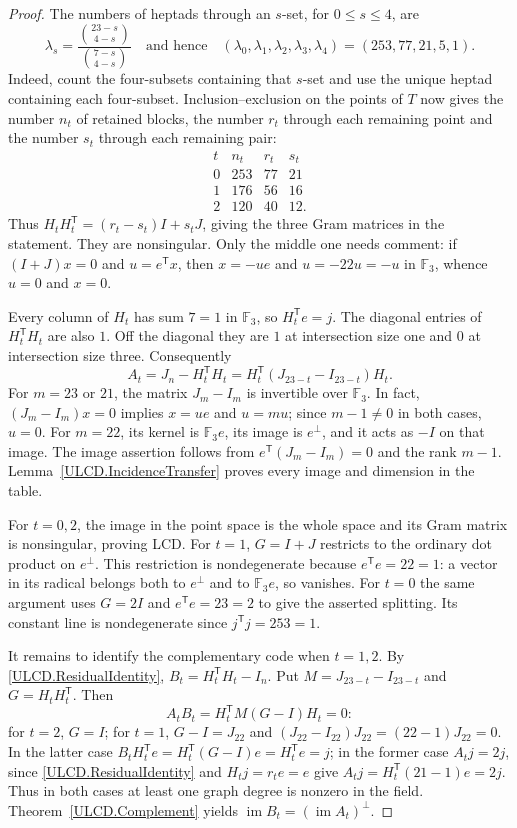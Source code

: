 \documentclass[11pt,a4paper]{article}
\numberwithin{equation}{section}
\newcommand{\im}{\operatorname{im}}
\begin{document}
\begin{proof}
The numbers of heptads through an $s$-set, for $0\leq s\leq4$, are
\[
 \lambda_s=\frac{\binom{23-s}{4-s}}{\binom{7-s}{4-s}}
       \quad\text{and hence}\quad
 (\lambda_0,\lambda_1,\lambda_2,\lambda_3,\lambda_4)
       =(253,77,21,5,1).
\]
Indeed, count the four-subsets containing that $s$-set and use the unique
heptad containing each four-subset. Inclusion--exclusion on the points of
$T$ now gives the number $n_t$ of retained blocks, the number $r_t$ through
each remaining point and the number $s_t$ through each remaining pair:
\[
\begin{array}{c|rrr}
t&n_t&r_t&s_t\\\hline
0&253&77&21\\
1&176&56&16\\
2&120&40&12.
\end{array}
\]
Thus $H_tH_t^{\mathsf T}=(r_t-s_t)I+s_tJ$, giving the three Gram matrices
in the statement. They are nonsingular. Only the middle one needs comment:
if $(I+J)x=0$ and $u=e^{\mathsf T}x$, then $x=-ue$ and
$u=-22u=-u$ in $\mathbb F_3$, whence $u=0$ and $x=0$.

Every column of $H_t$ has sum $7=1$ in $\mathbb F_3$, so
$H_t^{\mathsf T}e=j$. The diagonal entries of $H_t^{\mathsf T}H_t$ are
also $1$. Off the diagonal they are $1$ at intersection size one and $0$
at intersection size three. Consequently
\[
 A_t=J_n-H_t^{\mathsf T}H_t
     =H_t^{\mathsf T}(J_{23-t}-I_{23-t})H_t.                 \tag{2.1}\label{ULCD.ResidualIdentity}
\]
For $m=23$ or $21$, the matrix $J_m-I_m$ is invertible over $\mathbb F_3$.
In fact, $(J_m-I_m)x=0$ implies $x=ue$ and $u=mu$; since $m-1\ne0$
in both cases, $u=0$. For $m=22$, its kernel is $\mathbb F_3e$, its image
is $e^\perp$, and it acts as $-I$ on that image. The image assertion follows
from $e^{\mathsf T}(J_m-I_m)=0$ and the rank $m-1$.
Lemma~\ref{ULCD.IncidenceTransfer} proves every image and dimension in the table.

For $t=0,2$, the image in the point space is the whole space and its Gram
matrix is nonsingular, proving LCD. For $t=1$, $G=I+J$ restricts to the
ordinary dot product on $e^\perp$. This restriction is nondegenerate
because $e^{\mathsf T}e=22=1$: a vector in its radical belongs both to
$e^\perp$ and to $\mathbb F_3e$, so vanishes. For $t=0$ the same argument
uses $G=2I$ and $e^{\mathsf T}e=23=2$ to give the asserted splitting.
Its constant line is nondegenerate since $j^{\mathsf T}j=253=1$.

It remains to identify the complementary code when $t=1,2$.
By \eqref{ULCD.ResidualIdentity}, $B_t=H_t^{\mathsf T}H_t-I_n$. Put $M=J_{23-t}-I_{23-t}$ and
$G=H_tH_t^{\mathsf T}$. Then
\[
 A_tB_t=H_t^{\mathsf T}M(G-I)H_t=0:
\]
for $t=2$, $G=I$; for $t=1$, $G-I=J_{22}$ and
$(J_{22}-I_{22})J_{22}=(22-1)J_{22}=0$. In the latter case
$B_tH_t^{\mathsf T}e=H_t^{\mathsf T}(G-I)e=H_t^{\mathsf T}e=j$;
in the former case $A_tj=2j$, since \eqref{ULCD.ResidualIdentity} and $H_tj=r_te=e$ give
$A_tj=H_t^{\mathsf T}(21-1)e=2j$.
Thus in both cases at least one graph degree is nonzero in the field.
Theorem~\ref{ULCD.Complement} yields
$\im B_t=(\im A_t)^\perp$. 
\end{proof}
\end{document}
